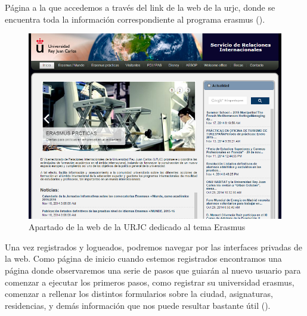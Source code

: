 P\'agina a la que accedemos a trav\'es del link de la web de la urjc, donde se encuentra toda la informaci\'on correspondiente al programa erasmus (\textit{}).\\
\begin{figure}[htbp]
	
	\centering
	\includegraphics[scale=0.5]{./Figuras/tuerasmusPages/publicPages/erasmusurjc.png}
	\caption{Apartado de la web de la URJC dedicado al tema Erasmus}
	\label{fig:erasmusurjc}
	
\end{figure}

Una vez registrados y logueados, podremos navegar por las interfaces privadas de la web. Como p\'agina de inicio cuando estemos registrados encontramos una p\'agina donde observaremos una serie de pasos que guiar\'an al nuevo usuario para comenzar a ejecutar los primeros pasos, como registrar su universidad erasmus, comenzar a rellenar los distintos formularios sobre la ciudad, asignaturas, residencias, y dem\'as informaci\'on que nos puede resultar bastante \'util (\textit{}).\\

